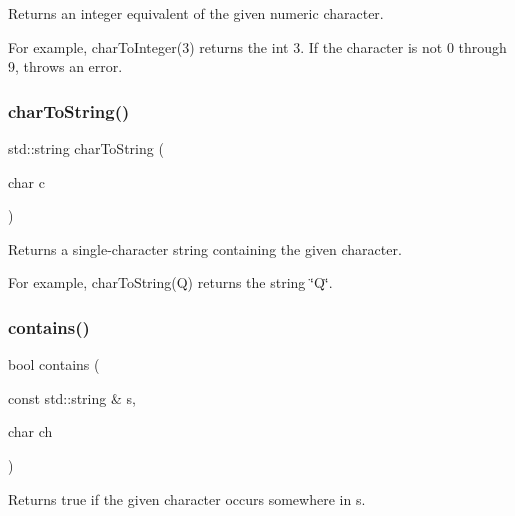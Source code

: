 Returns an integer equivalent of the given numeric character. 

For example, char\+To\+Integer(\textquotesingle{}3\textquotesingle{}) returns the int 3. If the character is not \textquotesingle{}0\textquotesingle{} through \textquotesingle{}9\textquotesingle{}, throws an error. \mbox{\label{namespacesgl_1_1priv_1_1strlib_afad9c4d2ec707624d928791a48309f1f}} 
\subsubsection{\texorpdfstring{char\+To\+String()}{charToString()}}
{\footnotesize\ttfamily std\+::string char\+To\+String (\begin{DoxyParamCaption}\item[{char}]{c }\end{DoxyParamCaption})}



Returns a single-\/character string containing the given character. 

For example, char\+To\+String(\textquotesingle{}Q\textquotesingle{}) returns the string \char`\"{}\+Q\char`\"{}. \mbox{\label{namespacesgl_1_1priv_1_1strlib_afaddda53f8dbc93d9f3b8955067e92d0}} 
\subsubsection{\texorpdfstring{contains()}{contains()}\hspace{0.1cm}{\footnotesize\ttfamily [1/2]}}
{\footnotesize\ttfamily bool contains (\begin{DoxyParamCaption}\item[{const std\+::string \&}]{s,  }\item[{char}]{ch }\end{DoxyParamCaption})}



Returns true if the given character occurs somewhere in s. 

\mbox{\label{namespacesgl_1_1priv_1_1strlib_aa15d39098819490cce8293e470e5ef36}} 
